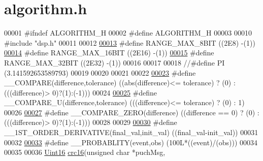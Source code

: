 \hypertarget{a00021_source}{\section{algorithm.\+h}
\label{a00021_source}
}

\begin{DoxyCode}
00001 \textcolor{preprocessor}{#ifndef ALGORITHM\_H}
00002 \textcolor{preprocessor}{#define ALGORITHM\_H}
00003 
00010 \textcolor{preprocessor}{#include "dsp.h"}
00011 
00012 
\hypertarget{a00021_source_l00013}{}\hyperlink{a00021_ae0c75a1cb44e5d3f00ec7c9e40acfda8}{00013} \textcolor{preprocessor}{#define RANGE\_MAX\_8BIT                                          ((2E8)  -(1))}
\hypertarget{a00021_source_l00014}{}\hyperlink{a00021_ae01726ef8ba0a9e1fe8655dc382ecda8}{00014} \textcolor{preprocessor}{#define RANGE\_MAX\_16BIT                                         ((2E16) -(1))}
\hypertarget{a00021_source_l00015}{}\hyperlink{a00021_a334bd006b6d2b397dbfc620d62c3c35c}{00015} \textcolor{preprocessor}{#define RANGE\_MAX\_32BIT                                         ((2E32) -(1))}
00016 
00017 
00018 \textcolor{comment}{//#define PI                                                      (3.141592653589793)}
00019 
00020 
00021 
00022 
\hypertarget{a00021_source_l00023}{}\hyperlink{a00021_a1aaf79017d1250538fff385827b7401e}{00023} \textcolor{preprocessor}{#define \_\_COMPARE(difference,tolerance)                         ((abs(difference)<= tolerance) ? (0) :
       (((difference)> 0)?(1):(-1)))}
00024 
\hypertarget{a00021_source_l00025}{}\hyperlink{a00021_a2ec57e7d50ba444ecb9e5c8b717d832d}{00025} \textcolor{preprocessor}{#define \_\_COMPARE\_U(difference,tolerance)                       (((difference)<= tolerance) ? (0) : 1)}
00026 
\hypertarget{a00021_source_l00027}{}\hyperlink{a00021_ad4d76cc0f801d947fd957435649b95bc}{00027} \textcolor{preprocessor}{#define \_\_COMPARE\_ZERO(difference)                              ((difference == 0) ? (0) : (((difference)>
       0)?(1):(-1)))}
00028 
00029 
\hypertarget{a00021_source_l00030}{}\hyperlink{a00021_ac57756fe3d634c3c5a1af000271d40e5}{00030} \textcolor{preprocessor}{#define \_\_1ST\_ORDER\_DERIVATIVE(final\_val,init\_val)              ((final\_val-init\_val))}
00031 
00032 
\hypertarget{a00021_source_l00033}{}\hyperlink{a00021_ab2185512402ea26115af112ce48175b2}{00033} \textcolor{preprocessor}{#define \_\_PROBABLITY(event,obs)                                 (100L*((event)/(obs)))}
00034 
00035 
00036 \hyperlink{a00072_a59a9f6be4562c327cbfb4f7e8e18f08b}{Uint16}                                                          \hyperlink{a00021_a6553827687db2137ee550ad6e1d2f316}{crc16}(\textcolor{keywordtype}{unsigned} \textcolor{keywordtype}{char} *puchMsg,

\end{DoxyCode}
